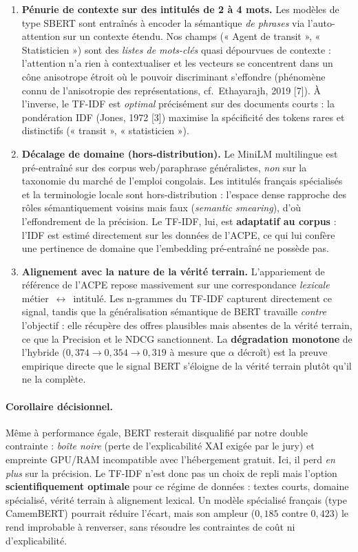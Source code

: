 \documentclass[11pt,a4paper]{article}
\begin{document}
\begin{enumerate}
  \item \textbf{Pénurie de contexte sur des intitulés de 2 à 4 mots.} Les modèles de type SBERT
  sont entraînés à encoder la sémantique \emph{de phrases} via l'auto-attention sur un contexte
  étendu. Nos champs (« Agent de transit », « Statisticien ») sont des \emph{listes de mots-clés}
  quasi dépourvues de contexte : l'attention n'a rien à contextualiser et les vecteurs se
  concentrent dans un cône anisotrope étroit où le pouvoir discriminant s'effondre (phénomène
  connu de l'anisotropie des représentations, cf.\ Ethayarajh, 2019 [7]). À l'inverse, le TF-IDF
  est \emph{optimal} précisément sur des documents courts : la pondération IDF (Jones, 1972 [3])
  maximise la spécificité des tokens rares et distinctifs (« transit », « statisticien »).

  \item \textbf{Décalage de domaine (hors-distribution).} Le MiniLM multilingue est pré-entraîné
  sur des corpus web/paraphrase généralistes, \emph{non} sur la taxonomie du marché de l'emploi
  congolais. Les intitulés français spécialisés et la terminologie locale sont hors-distribution :
  l'espace dense rapproche des rôles sémantiquement voisins mais faux (\emph{semantic smearing}),
  d'où l'effondrement de la précision. Le TF-IDF, lui, est \textbf{adaptatif au corpus} : l'IDF est
  estimé directement sur les données de l'ACPE, ce qui lui confère une pertinence de domaine que
  l'embedding pré-entraîné ne possède pas.

  \item \textbf{Alignement avec la nature de la vérité terrain.} L'appariement de référence de
  l'ACPE repose massivement sur une correspondance \emph{lexicale} métier~$\leftrightarrow$~intitulé.
  Les n-grammes du TF-IDF capturent directement ce signal, tandis que la généralisation sémantique
  de BERT travaille \emph{contre} l'objectif : elle récupère des offres plausibles mais absentes de
  la vérité terrain, ce que la $\mathrm{Precision}$ et le NDCG sanctionnent. La \textbf{dégradation
  monotone} de l'hybride ($0{,}374 \to 0{,}354 \to 0{,}319$ à mesure que $\alpha$ décroît) est la
  preuve empirique directe que le signal BERT s'éloigne de la vérité terrain plutôt qu'il ne la
  complète.
\end{enumerate}

\paragraph{Corollaire décisionnel.} Même à performance égale, BERT resterait disqualifié par notre
double contrainte : \emph{boîte noire} (perte de l'explicabilité XAI exigée par le jury) et
empreinte GPU/RAM incompatible avec l'hébergement gratuit. Ici, il perd \emph{en plus} sur la
précision. Le TF-IDF n'est donc pas un choix de repli mais l'option \textbf{scientifiquement
optimale} pour ce régime de données : textes courts, domaine spécialisé, vérité terrain à
alignement lexical. Un modèle spécialisé français (type CamemBERT) pourrait réduire l'écart, mais
son ampleur ($0{,}185$ contre $0{,}423$) le rend improbable à renverser, sans résoudre les
contraintes de coût ni d'explicabilité.
\end{document}
